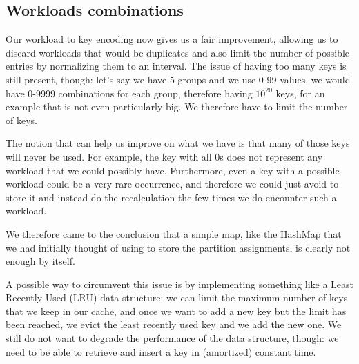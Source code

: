 \subsection{Workloads combinations}\label{sec:Workloads-combinations}
Our workload to key encoding now gives us a fair improvement, allowing us to discard workloads that would be duplicates and also limit the number of possible entries by normalizing them to an interval. The issue of having too many keys is still present, though: let's say we have 5 groups and we use 0-99 values, we would have 0-9999 combinations for each group, therefore having $10^{20}$ keys, for an example that is not even particularly big. We therefore have to limit the number of keys. 

The notion that can help us improve on what we have is that many of those keys will never be used. For example, the key with all 0s does not represent any workload that we could possibly have. Furthermore, even a key with a possible workload could be a very rare occurrence, and therefore we could just avoid to store it and instead do the recalculation the few times we do encounter such a workload. 

We therefore came to the conclusion that a simple map, like the HashMap that we had initially thought of using to store the partition assignments, is clearly not enough by itself.

A possible way to circumvent this issue is by implementing something like a Least Recently Used (LRU) data structure: we can limit the maximum number of keys that we keep in our cache, and once we want to add a new key but the limit has been reached, we evict the least recently used key and we add the new one. We still do not want to degrade the performance of the data structure, though: we need to be able to retrieve and insert a key in (amortized) constant time.


